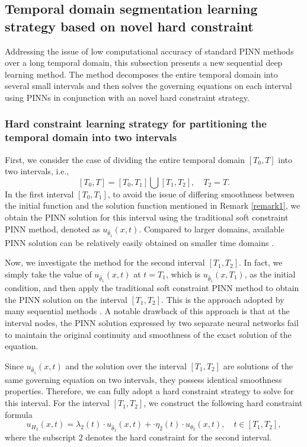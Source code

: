 \documentclass[preprint]{elsarticle}
\numberwithin{table}{section}
\numberwithin{equation}{section}
\numberwithin{figure}{section}
\begin{document}
\begin{CJK}{UTF8}{gbsn}
\subsection{ Temporal domain segmentation learning strategy based on novel hard constraint}

 
 
  Addressing the issue of low computational accuracy of standard PINN methods over a long temporal domain, this subsection presents a new sequential deep learning method. The method decomposes the entire temporal domain into several small intervals and then solves the governing equations on each interval using PINNs in conjunction with an novel hard constraint strategy.

  \subsubsection{
  Hard constraint learning strategy for partitioning the temporal domain  into  two intervals}
\label{sec:2sub}

First, we consider the case of dividing the entire temporal domain  $[T_0, T]$ into two intervals, i.e.,
 $$[T_0, T]=[T_0, T_1]\bigcup[T_1,T_2],\quad T_2=T.$$
In the first interval $[T_0, T_1]$, to avoid the issue of differing smoothness between the initial function and the solution function mentioned in Remark \ref{remark1}, we obtain the PINN solution for this interval using the traditional soft constraint PINN method, denoted as $u_{\hat\theta_1}(x,t)$. Compared to larger domains, available PINN solution can be relatively easily obtained on smaller time domains \cite{haitsiukevich2023improved}.

Now, we investigate the   method for the second interval $[T_1, T_2]$. In fact, we simply take the value of  $u_{\hat\theta_1}(x,t)$ at $t=T_1$, which is  
$u_{\hat\theta_1}(x,T_1)$, as the initial condition, and then apply the traditional soft constraint PINN method to obtain the PINN solution on the interval $[T_1, T_2]$. This is the approach adopted by many sequential methods \cite{PENWARDEN2023112464,CiCP-29-930,JUNG2024117036}. A notable drawback of this approach is that at the interval nodes, the PINN solution expressed by two separate neural networks fail to maintain the original continuity and smoothness of the exact solution of the equation.


 
 
Since $u_{\hat\theta_1}(x,t)$ and the solution over the interval $[T_1,T_2]$ are solutions of the same governing equation on two intervals,   {they possess identical smoothness properties.} Therefore, we can fully adopt a hard constraint strategy to solve for this interval. For the interval $[T_1,T_2]$, we construct the following hard constraint formula
\begin{equation}\label{eq:HC_YYZ3}
     u_{H_2}(x,t) = \lambda_2(t)\cdot u_{\hat\theta_1}(x,t) +  \cdot\eta_2(t)\cdot u_{\theta_2}(x,t),\quad t\in [T_1,T_2],
\end{equation}
where the subscript $2$ denotes the hard constraint   for the second interval. 


\end{CJK}
\end{document}
